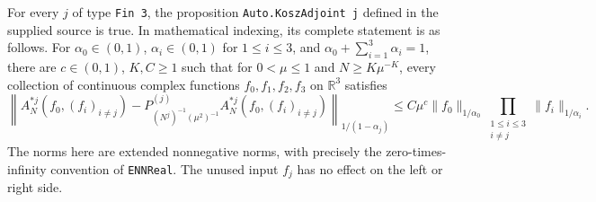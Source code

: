 \documentclass[11pt]{article}
\theoremstyle{definition}
\newcommand{\pid}[1]{\nolinkurl{#1}}
\newcommand{\R}{\mathbb R}
\begin{document}
\begin{corollary}\label{new:exact-lean-target}
For every $j$ of type \pid{Fin 3}, the proposition \pid{Auto.KoszAdjoint j} defined in the supplied
source is true. In mathematical indexing, its complete statement is as follows.
For $\alpha_0\in(0,1)$, $\alpha_i\in(0,1)$ for $1\leq i\leq3$, and
$\alpha_0+\sum_{i=1}^3\alpha_i=1$, there are $c\in(0,1)$, $K,C\geq1$ such that for
$0<\mu\leq1$ and $N\geq K\mu^{-K}$, every collection of continuous complex functions
$f_0,f_1,f_2,f_3$ on $\R^3$ satisfies
\[
 \left\|A_N^{*j}(f_0,(f_i)_{i\ne j})
     -P_{(N^j)^{-1}(\mu^2)^{-1}}^{(j)}A_N^{*j}(f_0,(f_i)_{i\ne j})
          \right\|_{1/(1-\alpha_j)}
 \leq C\mu^c\|f_0\|_{1/\alpha_0}
                 \prod_{\substack{1\leq i\leq3\\i\ne j}}\|f_i\|_{1/\alpha_i}.
\]
The norms here are extended nonnegative norms, with precisely the zero-times-infinity
convention of \pid{ENNReal}. The unused input $f_j$ has no effect on the left or right side.
\end{corollary}
\end{document}

